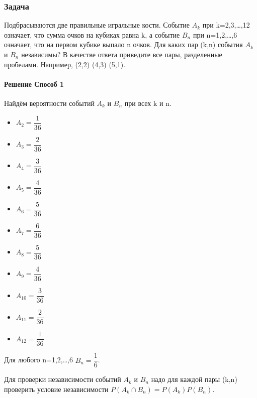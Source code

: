 \documentclass[a4paper,12pt]{article}
\begin{document}
\subsubsection*{Задача}
Подбрасываются две правильные игральные кости. Событие \(A_k\) при k=2,3,…,12 означает, что сумма очков на кубиках равна k, а событие \(B_n\) при n=1,2,…,6 означает, что на первом кубике выпало n очков. Для каких пар (k,n) события \(A_k\) и \(B_n\) независимы? В качестве ответа приведите все пары, разделенные пробелами. Например, (2,2) (4,3) (5,1).
\paragraph{Решение Способ 1} 
Найдём вероятности событий \(A_k\) и \(B_n\) при всех k и n.
\begin{itemize}
	\item \(A_2 = \dfrac{1}{36} \)
	\item \(A_3 = \dfrac{2}{36} \)
	\item \(A_4 = \dfrac{3}{36} \)
	\item \(A_5 = \dfrac{4}{36} \)
	\item \(A_6 = \dfrac{5}{36} \)
	\item \(A_7 = \dfrac{6}{36} \)
	\item \(A_8 = \dfrac{5}{36} \)
	\item \(A_9 = \dfrac{4}{36} \)
	\item \(A_10 = \dfrac{3}{36} \)
	\item \(A_11 = \dfrac{2}{36} \)
	\item \(A_12 = \dfrac{1}{36} \)
\end{itemize}

Для любого n=1,2,…,6 \(B_n = \dfrac{1}{6} \).

Для проверки независимости событий \(A_k \) и \(B_n\) надо для каждой пары (k,n)  проверить условие независимости \(P(A_k \cap B_n) = P(A_k)P(B_n)\).
\end{document}
